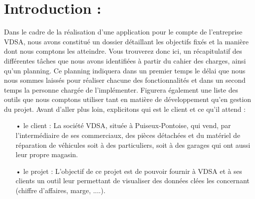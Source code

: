 \section*{Introduction :}

Dans le cadre de la réalisation d'une application pour le compte de l'entreprise VDSA, nous avons constitué un dossier détaillant les objectifs fixés et la manière dont nous comptons les atteindre. Vous trouverez donc ici, un récapitulatif des différentes tâches que nous avons identifiées à partir du cahier des charges, ainsi qu'un planning. Ce planning indiquera dans un premier temps le délai que nous nous sommes laissés pour réaliser chacune des fonctionnalités et dans un second temps la personne chargée de l'implémenter. Figurera également une liste des outils que nous comptons utiliser tant en matière de développement qu'en gestion du projet. 
Avant d'aller plus loin, explicitons qui est le client et ce qu'il attend :\\
\begin{enumerate}
\item[•] le client : La société VDSA, située à Puiseux-Pontoise, qui vend, par l’intermédiaire de ses commerciaux, des pièces détachées et du matériel de réparation de véhicules soit à des particuliers, soit à des garages qui ont aussi leur propre magasin.
\item[•] le projet : L’objectif de ce projet est de pouvoir fournir à VDSA et à ses clients un outil leur permettant de visualiser des données clées les concernant (chiffre d'affaires, marge, ....). 
\end{enumerate}

